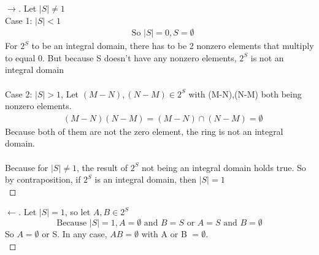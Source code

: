 \documentclass[12pt]{article}
\begin{document}
\begin{enumerate}[label = (\alph*)]
\begin{proof}[$\rightarrow$]
				Let $|S| \not = 1$ \\
				Case 1: $|S| < 1$
					\begin{align*}
						&\text{So } |S| = 0, S = \emptyset
					\end{align*} 
					For $2^S$ to be an integral domain, there has to be 2 nonzero elements that multiply to equal 0.  But because S doesn't have any nonzero elements, $2^S$ is not an integral domain \\ \\ 
				Case 2: $|S| > 1$, Let $(M-N),(N-M) \in 2^S$ with (M-N),(N-M) both being nonzero elements.
					\begin{align}
						&(M-N)(N-M) = (M-N) \cap (N-M) = \emptyset
					\end{align}
				Because both of them are not the zero element, the ring is not an integral domain. 
				\\ \\
				Because for $|S| \not = 1$, the result of $2^S$ not being an integral domain holds true. So by contraposition, if $2^S$ is an integral domain, then $|S| = 1$ \\
			\end{proof}
			\begin{proof}[$\leftarrow$]
				Let $|S| = 1$, so let $A,B \in 2^S$
				$$\text{Because } |S| = 1, A = \emptyset \text{ and } B = S \text{ or } A = S \text{ and } B = \emptyset$$
				So $A = \emptyset$ or S. In any case, $AB = \emptyset$ with A or B $ = \emptyset$. \\ 
			\end{proof}
	\end{enumerate}
\end{document}
